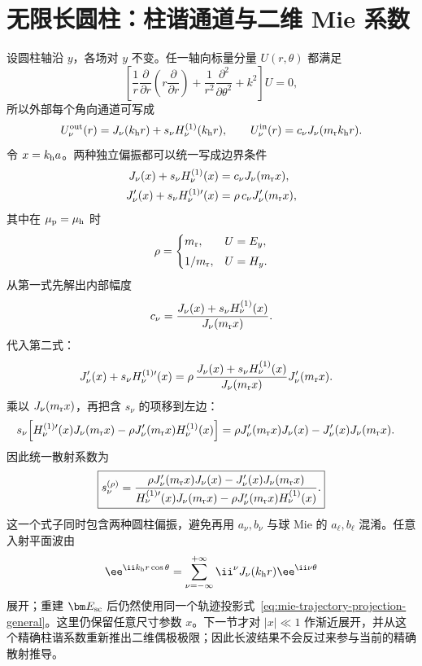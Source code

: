 \section{无限长圆柱：柱谐通道与二维 Mie 系数}
设圆柱轴沿 $y$，各场对 $y$ 不变。任一轴向标量分量 $U(r,\theta)$ 都满足
\begin{equation}
\left[
\frac{1}{r}\frac{\partial}{\partial r}
\left(r\frac{\partial}{\partial r}\right)
+\frac{1}{r^2}\frac{\partial^2}{\partial\theta^2}
+k^2
\right]U=0,
\end{equation}
所以外部每个角向通道可写成
\begin{equation}
U_\nu^{\rm out}(r)
=J_\nu(k_{\rm h}r)+s_\nu H_\nu^{(1)}(k_{\rm h}r),
\qquad
U_\nu^{\rm in}(r)=c_\nu J_\nu(m_{\rm r}k_{\rm h}r).
\end{equation}
令 $x=k_{\rm h}a$。两种独立偏振都可以统一写成边界条件
\begin{align}
J_\nu(x)+s_\nu H_\nu^{(1)}(x)
&=c_\nu J_\nu(m_{\rm r}x),\\
J_\nu'(x)+s_\nu H_\nu^{(1)\prime}(x)
&=\rho\,c_\nu J_\nu'(m_{\rm r}x),
\label{eq:cylinder-general-bc}
\end{align}
其中在 $\mu_{\rm p}=\mu_{\rm h}$ 时
\begin{equation}
\rho=
\begin{cases}
m_{\rm r}, & U=E_y,\\[0.3em]
1/m_{\rm r}, & U=H_y.
\end{cases}
\label{eq:cylinder-rho}
\end{equation}
从第一式先解出内部幅度
\begin{equation}
c_\nu
=\frac{J_\nu(x)+s_\nu H_\nu^{(1)}(x)}{J_\nu(m_{\rm r}x)}.
\end{equation}
代入第二式：
\begin{align}
J_\nu'(x)+s_\nu H_\nu^{(1)\prime}(x)
&=\rho\,
\frac{J_\nu(x)+s_\nu H_\nu^{(1)}(x)}{J_\nu(m_{\rm r}x)}
J_\nu'(m_{\rm r}x).
\end{align}
乘以 $J_\nu(m_{\rm r}x)$，再把含 $s_\nu$ 的项移到左边：
\begin{align}
s_\nu\Bigl[
H_\nu^{(1)\prime}(x)J_\nu(m_{\rm r}x)
-\rho J_\nu'(m_{\rm r}x)H_\nu^{(1)}(x)
\Bigr]
={}&\rho J_\nu'(m_{\rm r}x)J_\nu(x)
-J_\nu'(x)J_\nu(m_{\rm r}x).
\end{align}
因此统一散射系数为
\begin{equation}
\boxed{
s_\nu^{(\rho)}=
\frac{\rho J_\nu'(m_{\rm r}x)J_\nu(x)
-J_\nu'(x)J_\nu(m_{\rm r}x)}
{H_\nu^{(1)\prime}(x)J_\nu(m_{\rm r}x)
-\rho J_\nu'(m_{\rm r}x)H_\nu^{(1)}(x)}.}
\label{eq:cylinder-scattering-general}
\end{equation}
这一个式子同时包含两种圆柱偏振，避免再用 $a_\nu,b_\nu$ 与球 Mie 的 $a_\ell,b_\ell$ 混淆。任意入射平面波由
\begin{equation}
\ee^{\ii k_{\rm h}r\cos\theta}
=\sum_{\nu=-\infty}^{+\infty}
\ii^\nu J_\nu(k_{\rm h}r)\ee^{\ii\nu\theta}
\end{equation}
展开；重建 $\bm E_{\rm sc}$ 后仍然使用同一个轨迹投影式~\eqref{eq:mie-trajectory-projection-general}。这里仍保留任意尺寸参数 $x$。下一节才对 $|x|\ll1$ 作渐近展开，并从这个精确柱谐系数重新推出二维偶极极限；因此长波结果不会反过来参与当前的精确散射推导。


